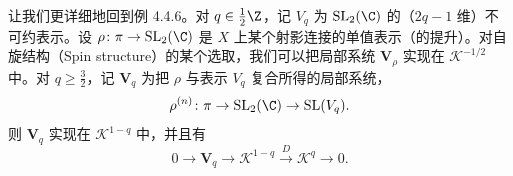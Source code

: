让我们更详细地回到例 4.4.6。对 $q\in\frac{1}{2}\Z$，记 $V_q$ 为 $\mathrm{SL}_2(\C)$ 的（$2q-1$ 维）不可约表示。设 $\rho\colon\pi\to\mathrm{SL}_2(\C)$ 是 $X$ 上某个射影连接的单值表示（的提升）。对自旋结构（Spin structure）的某个选取，我们可以把局部系统 $\mathbf{V}_\rho$ 实现在 $\mathcal{K}^{-1/2}$ 中。对 $q\ge\frac{3}{2}$，记 $\mathbf{V}_q$ 为把 $\rho$ 与表示 $V_q$ 复合所得的局部系统，
\[
\rho^{(n)}\colon\pi\to\mathrm{SL}_2(\C)\to\mathrm{SL}(V_q).
\]
则 $\mathbf{V}_q$ 实现在 $\mathcal{K}^{1-q}$ 中，并且有
\begin{equation}
0\to\mathbf{V}_q\to\mathcal{K}^{1-q}\xrightarrow{\ D\ }\mathcal{K}^q\to0.
\tag{4.64}
\end{equation}
